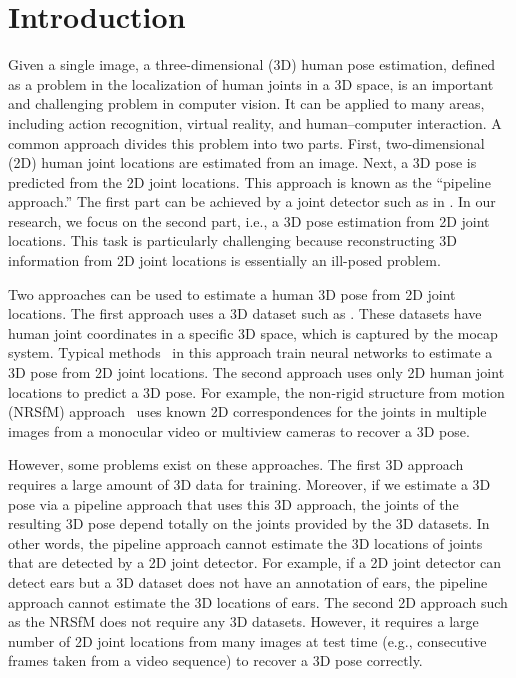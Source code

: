 \documentclass[runningheads]{llncs}
\begin{document}
\section{Introduction}
Given a single image, a three-dimensional (3D) human pose estimation, defined as a problem in the localization of human joints in a 3D space, is an important and challenging problem in computer vision.
It can be applied to many areas, including action recognition, virtual reality, and human--computer interaction.
A common approach divides this problem into two parts.
First, two-dimensional (2D) human joint locations are estimated from an image.
Next, a 3D pose is predicted from the 2D joint locations.
This approach is known as the ``pipeline approach.''
The first part can be achieved by a joint detector such as in \cite{toshev2014deeppose,tompson2014joint,chen2014articulated,tompson2015efficient,fan2015combining,wei2016cpm,carreira2016iterative,bulat2016heatmap,pishchulin2016deepcut,newell2016stacked,cao2017realtime}.
In our research, we focus on the second part, i.e., a 3D pose estimation from 2D joint locations.
This task is particularly challenging because reconstructing 3D information from 2D joint locations is essentially an ill-posed problem.

Two approaches can be used to estimate a human 3D pose from 2D joint locations.
The first approach uses a 3D dataset such as \cite{sigal2010humaneva,ionescu2014human3.6m,mpi-inf}.
These datasets have human joint coordinates in a specific 3D space, which is captured by the mocap system.
Typical methods~\cite{martinez20173dbaseline,tome2017lifting,wu2016single,pavlakos2017coarse} in this approach train neural networks to estimate a 3D pose from 2D joint locations.
The second approach uses only 2D human joint locations to predict a 3D pose.
For example, the non-rigid structure from motion (NRSfM) approach~\cite{bregler2000recovering,akhter2011trajectory,gotardo2011computing,lee2016procrustean} uses known 2D correspondences for the joints in multiple images from a monocular video or multiview cameras to recover a 3D pose.

However, some problems exist on these approaches.
The first 3D approach requires a large amount of 3D data for training.
Moreover, if we estimate a 3D pose via a pipeline approach that uses this 3D approach, the joints of the resulting 3D pose depend totally on the joints provided by the 3D datasets.
In other words, the pipeline approach cannot estimate the 3D locations of joints that are detected by a 2D joint detector.
For example, if a 2D joint detector can detect ears but a 3D dataset does not have an annotation of ears, the pipeline approach cannot estimate the 3D locations of ears.
The second 2D approach such as the NRSfM does not require any 3D datasets.
However, it requires a large number of 2D joint locations from many images at test time (e.g., consecutive frames taken from a video sequence) to recover a 3D pose correctly.
\end{document}
